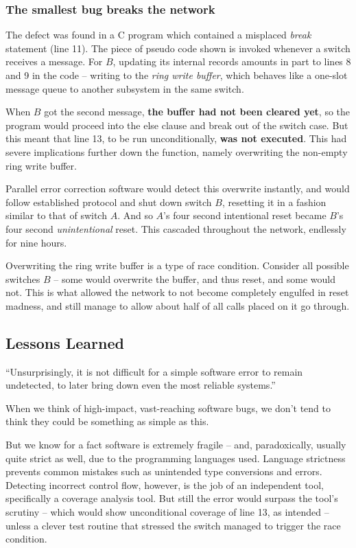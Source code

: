 \documentclass[12pt,a4paper,notitlepage]{article}
\begin{document}
\subsubsection{The smallest bug breaks the network}

The defect was found in a \textsf{C} program which contained a misplaced \textit{break} statement (line 11).\supercite{dennisburke1995,popularscience1990}
The piece of pseudo code shown is invoked whenever a switch receives a message.\supercite{popularscience1990}
For $B$, updating its internal records amounts in part to lines 8 and 9 in the code -- writing to the \textsl{ring write buffer}, which behaves like a one-slot message queue to another subsystem in the same switch.

When $B$ got the second message, \textbf{the buffer had not been cleared yet}, so the program would proceed into the else clause and break out of the switch case.
But this meant that line 13, to be run unconditionally, \textbf{was not executed}.
This had severe implications further down the function, namely overwriting the non-empty ring write buffer.

Parallel error correction software would detect this overwrite instantly, and would follow established protocol and shut down switch $B$, resetting it in a fashion similar to that of switch $A$.
And so $A$'s four second intentional reset became $B$'s four second \emph{unintentional} reset.
This cascaded throughout the network, endlessly for nine hours.

Overwriting the ring write buffer is a type of race condition.
Consider all possible switches $B$ -- some would overwrite the buffer, and thus reset, and some would not.
This is what allowed the network to not become completely engulfed in reset madness, and still manage to allow about half of all calls placed on it go through.

\subsection{Lessons Learned}

``Unsurprisingly, it is not difficult for a simple software error to remain undetected, to later bring down even the most reliable systems.''\supercite{dennisburke1995}

When we think of high-impact, vast-reaching software bugs, we don't tend to think they could be something as simple as this.

But we know for a fact software is extremely fragile -- and, paradoxically, usually quite strict as well, due to the programming languages used.
Language strictness prevents common mistakes such as unintended type conversions and errors.
Detecting incorrect control flow, however, is the job of an independent tool, specifically a coverage analysis tool.
But still the error would surpass the tool's scrutiny -- which would show unconditional coverage of line 13, as intended -- unless a clever test routine that stressed the switch managed to trigger the race condition.
\end{document}
